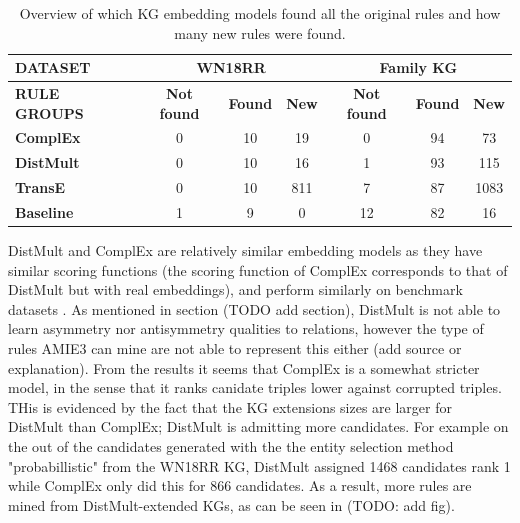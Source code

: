 \begin{table}[h]
\begin{tabular}{|l|ccc||ccc|}
\hline
{\textbf{DATASET}}   & \multicolumn{3}{c||}{\textbf{WN18RR}}                                                                              & \multicolumn{3}{c|}{\textbf{Family KG}}                                                           \\ \hline
{\textbf{RULE GROUPS}}   & \multicolumn{1}{c|}{\textbf{Not found}} & \multicolumn{1}{c|}{\textbf{Found}} & \multicolumn{1}{c||}{\textbf{New}} & \multicolumn{1}{c|}{\textbf{Not found}} & \multicolumn{1}{c|}{\textbf{Found}} & \multicolumn{1}{c|}{\textbf{New}} \\ \hline
\textbf{ComplEx}  & \multicolumn{1}{c|}{0}                  & \multicolumn{1}{c|}{10}             & \multicolumn{1}{c||}{19}           & \multicolumn{1}{c|}{0}                  & \multicolumn{1}{c|}{94}             & \multicolumn{1}{c|}{73}           \\ \hline
\textbf{DistMult} & \multicolumn{1}{c|}{0}                     & \multicolumn{1}{c|}{10}                                  & 16                                & \multicolumn{1}{c|}{1}         & \multicolumn{1}{c|}{93}          & 115                               \\ \hline
\textbf{TransE}   & \multicolumn{1}{c|}{0}         & \multicolumn{1}{c|}{10}                     & 811                               & \multicolumn{1}{c|}{7}       & \multicolumn{1}{c|}{87}      & 1083                              \\ \hline
\textbf{Baseline} & \multicolumn{1}{c|}{1}     & \multicolumn{1}{c|}{9}                   & 0                                 & \multicolumn{1}{c|}{12}       & \multicolumn{1}{c|}{82}         & 16                                \\ \hline
\end{tabular}
\caption{Overview of which KG embedding models found all the original rules and how many new rules were found.}
\end{table}

DistMult and ComplEx are relatively similar embedding models as they have similar scoring functions (the scoring function of ComplEx corresponds to that of DistMult but with real embeddings), and perform similarly on benchmark datasets \cite{complEx}. As mentioned in section (TODO add section), DistMult is not able to learn asymmetry nor antisymmetry qualities to relations, however the type of rules AMIE3 can mine are not able to represent this either (add source or explanation). From the results it seems that ComplEx is a somewhat stricter model, in the sense that it ranks canidate triples lower against corrupted triples. THis is evidenced by the fact that the KG extensions sizes are larger for DistMult than ComplEx; DistMult is admitting more candidates. For example on the out of the candidates generated with the the entity selection method "probabillistic" from the WN18RR KG, DistMult assigned 1468 candidates rank 1 while ComplEx only did this for 866 candidates. As a result, more rules are mined from DistMult-extended KGs, as can be seen in (TODO: add fig). 

